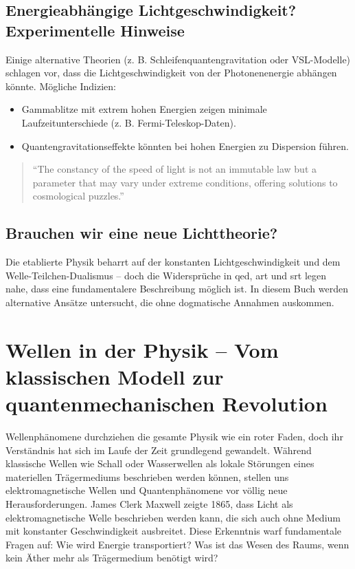 \subsection{Energieabhängige Lichtgeschwindigkeit? Experimentelle Hinweise}
Einige alternative Theorien (z. B. Schleifenquantengravitation oder VSL-Modelle) schlagen vor, dass die Lichtgeschwindigkeit von der Photonenenergie abhängen könnte.
Mögliche Indizien:

\begin{itemize}
    \item Gammablitze mit extrem hohen Energien zeigen minimale Laufzeitunterschiede (z. B. Fermi-Teleskop-Daten).
    \item Quantengravitationseffekte könnten bei hohen Energien zu Dispersion führen.
\end{itemize}

\begin{quote}
    \enquote{The constancy of the speed of light is not an immutable law but a parameter that may vary under extreme conditions, offering solutions to cosmological puzzles.} \cite{Magueijo2003}
\end{quote}

\subsection{Brauchen wir eine neue Lichttheorie?}
Die etablierte Physik beharrt auf der konstanten Lichtgeschwindigkeit und dem Welle-Teilchen-Dualismus – doch die Widersprüche in \gls{qed}, \gls{art} und \gls{srt} legen nahe,
dass eine fundamentalere Beschreibung möglich ist. In diesem Buch werden alternative Ansätze untersucht, die ohne dogmatische Annahmen auskommen.

\section{Wellen in der Physik – Vom klassischen Modell zur quantenmechanischen Revolution}
Wellenphänomene durchziehen die gesamte Physik wie ein roter Faden, doch ihr Verständnis hat sich im Laufe der Zeit grundlegend gewandelt. Während klassische Wellen wie Schall
oder Wasserwellen als lokale Störungen eines materiellen Trägermediums beschrieben werden können, stellen uns elektromagnetische Wellen und Quantenphänomene vor völlig neue
Herausforderungen. James Clerk Maxwell zeigte 1865, dass Licht als elektromagnetische Welle beschrieben werden kann, die sich auch ohne Medium mit konstanter
Geschwindigkeit ausbreitet. Diese Erkenntnis warf fundamentale Fragen auf: Wie wird Energie transportiert? Was ist das Wesen des Raums, wenn kein Äther mehr als Trägermedium benötigt wird?

